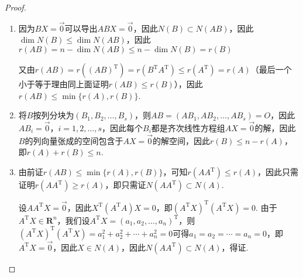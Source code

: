 \begin{proof}
    \begin{enumerate}
        \item 因为$BX=\vec{0}$可以导出$ABX=\vec{0}$，因此$N(B)\subset N(AB)$，因此$\dim N(B)\leqslant\dim N(AB)$，因此$r(AB)=n-\dim N(AB)\leqslant n-\dim N(B)=r(B)$

        又由$r(AB)=r((AB)^{\mathrm{T}})=r(B^{\mathrm{T}}A^{\mathrm{T}})\leqslant r(A^{\mathrm{T}})=r(A)$（最后一个小于等于理由同上面证明$r(AB)\leqslant r(B)$），因此$r(AB)\leqslant\min\{r(A),r(B)\}$.

        \item 将$B$按列分块为$(B_1,B_2,\ldots,B_s)$，则$AB=(AB_1,AB_2,\ldots,AB_s)=O$，因此$AB_i=\vec{0}$，$i=1,2,\ldots,s$，因此每个$B_i$都是齐次线性方程组$AX=\vec{0}$的解，因此$B$的列向量张成的空间包含于$AX=\vec{0}$的解空间，因此$r(B)\leqslant n-r(A)$，即$r(A)+r(B)\leqslant n$.

        \item 由前证$r(AB)\leqslant\min\{r(A),r(B)\}$，可知$r(AA^\mathrm{T})\leqslant r(A)$，因此只需证明$r(AA^\mathrm{T})\geqslant r(A)$，即只需证$N(AA^\mathrm{T})\subset N(A)$.

        设$AA^\mathrm{T}X=\vec{0}$，因此$X^\mathrm{T}(A^\mathrm{T}A)X=0$，即$(A^\mathrm{T}X)^\mathrm{T}(A^\mathrm{T}X)=0$. 由于$A^\mathrm{T}X\in\mathbf{R}^n$，我们设$A^\mathrm{T}X=(a_1,a_2,\ldots,a_n)^\mathrm{T}$，则$(A^\mathrm{T}X)^\mathrm{T}(A^\mathrm{T}X)=a_1^2+a_2^2+\cdots+a_n^2=0$可得$a_1=a_2=\cdots=a_n=0$，即$A^\mathrm{T}X=\vec{0}$，因此$X \in N(A)$，因此$N(AA^\mathrm{T})\subset N(A)$，得证.


\end{enumerate}
\end{proof}

